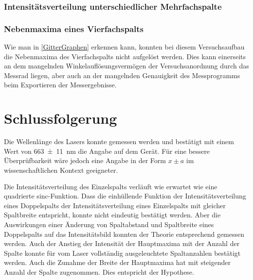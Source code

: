 \documentclass[
	a4paper,
	12pt,
	pagesize,
	ngerman
]{scrartcl}
\begin{document}
	\subsubsection{Intensitätsverteilung unterschiedlicher Mehrfachspalte}
	
	
	\subsubsection{Nebenmaxima eines Vierfachspalts}
	Wie man in \cref{GitterGraphen} erkennen kann, konnten bei diesem Versuchsaufbau die Nebenmaxima des Vierfachspalts nicht aufgelöst werden.
	Dies kann einerseits an dem mangelnden Winkelauflösungsvermögen der Versuchsanordnung durch das Messrad liegen, aber auch an der mangelnden Genauigkeit des Messprogramms beim Exportieren der Messergebnisse.
	
	
	
	\section{Schlussfolgerung}
	Die Wellenlänge des Lasers konnte gemessen werden und bestätigt mit einem Wert von \SI{663\pm 11}{nm} die Angabe auf dem Gerät.
	Für eine bessere Überprüfbarkeit wäre jedoch eine Angabe in der Form $x\pm a$ im wissenschaftlichen Kontext geeigneter.
	
	Die Intensitätsverteilung des Einzelspalts verläuft wie erwartet wie eine quadrierte sinc-Funktion.
	Dass die einhüllende Funktion der Intensitätsverteilung eines Doppelspalts der Intensitätsverteilung eines Einzelspalts mit gleicher Spaltbreite entspricht, konnte nicht eindeutig bestätigt werden.
	Aber die Auswirkungen einer Änderung von Spaltabstand und Spaltbreite eines Doppelspalts auf das Intensitätsbild konnten der Theorie entsprechend gemessen werden.
	Auch der Anstieg der Intensität der Hauptmaxima mit der Anzahl der Spalte konnte für vom Laser vollständig ausgeleuchtete Spaltanzahlen bestätigt werden.
	Auch die Zunahme der Breite der Hauptmaxima hat mit steigender Anzahl der Spalte zugenommen.
	Dies entspricht der Hypothese.
	
	\printbibliography
\end{document}
